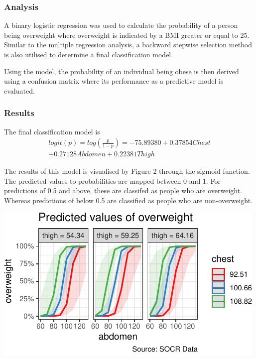\documentclass[a4paper,9pt,twocolumn,twoside,]{pinp}
\begin{document}
\hypertarget{analysis-2}{%
\subsubsection{Analysis}\label{analysis-2}}

A binary logistic regression was used to calculate the probability of a
person being overweight where overweight is indicated by a BMI greater
or equal to 25. Similar to the multiple regression analysis, a backward
stepwise selection method is also utilised to determine a final
classification model.

Using the model, the probability of an individual being obese is then
derived using a confusion matrix where its performance as a predictive
model is evaluated.

\hypertarget{results-1}{%
\subsubsection{Results}\label{results-1}}

The final classification model is \[
\begin{aligned}
logit(p)=log(\frac{p}{1-p})=-75.89380+0.37854Chest\\ +0.27128Abdomen+0.22381Thigh
\end{aligned}
\]

The results of this model is visualised by Figure 2 through the sigmoid
function. The predicted values to probabilities are mapped between 0 and
1. For predictions of 0.5 and above, these are classifed as people who
are overweight. Whereas predictions of below 0.5 are classified as
people who are non-overweight.

\begin{center}\includegraphics{Executive_Report_files/figure-latex/unnamed-chunk-2-1} \end{center}
\end{document}
